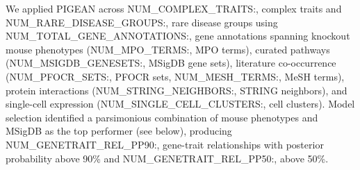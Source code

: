 We applied PIGEAN across {{NUM_COMPLEX_TRAITS:,}} complex traits and {{NUM_RARE_DISEASE_GROUPS:,}} rare disease groups using {{NUM_TOTAL_GENE_ANNOTATIONS:,}} gene annotations spanning knockout mouse phenotypes ({{NUM_MPO_TERMS:,}} MPO terms), curated pathways ({{NUM_MSIGDB_GENESETS:,}} MSigDB gene sets), literature co-occurrence ({{NUM_PFOCR_SETS:,}} PFOCR sets, {{NUM_MESH_TERMS:,}} MeSH terms), protein interactions ({{NUM_STRING_NEIGHBORS:,}} STRING neighbors), and single-cell expression ({{NUM_SINGLE_CELL_CLUSTERS:,}} cell clusters). Model selection identified a parsimonious combination of mouse phenotypes and MSigDB as the top performer (see below), producing {{NUM_GENETRAIT_REL_PP90:,}} gene-trait relationships with posterior probability above 90\% and {{NUM_GENETRAIT_REL_PP50:,}} above 50\%.
